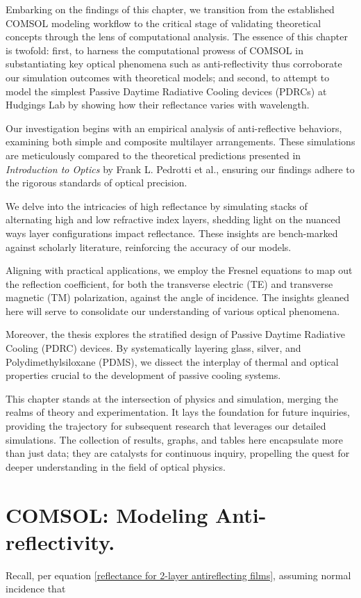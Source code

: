 Embarking on the findings of this chapter, we transition from the established COMSOL modeling workflow to the critical stage of validating theoretical concepts through the lens of computational analysis. The essence of this chapter is twofold: first, to harness the computational prowess of COMSOL in substantiating key optical phenomena such as anti-reflectivity thus corroborate our simulation outcomes with theoretical models; and second, to attempt to model the simplest Passive Daytime Radiative Cooling devices (PDRCs) at Hudgings Lab by showing how their reflectance varies with wavelength.

Our investigation begins with an empirical analysis of anti-reflective behaviors, examining both simple and composite multilayer arrangements. These simulations are meticulously compared to the theoretical predictions presented in \emph{Introduction to Optics} by Frank L. Pedrotti et al., ensuring our findings adhere to the rigorous standards of optical precision.

We delve into the intricacies of high reflectance by simulating stacks of alternating high and low refractive index layers, shedding light on the nuanced ways layer configurations impact reflectance. These insights are bench-marked against scholarly literature, reinforcing the accuracy of our models.

Aligning with practical applications, we employ the Fresnel equations to map out the reflection coefficient, for both the transverse electric (TE) and transverse magnetic (TM) polarization, against the angle of incidence. The insights gleaned here will serve to consolidate our understanding of various optical phenomena.

Moreover, the thesis explores the stratified design of Passive Daytime Radiative Cooling (PDRC) devices. By systematically layering glass, silver, and Polydimethylsiloxane (PDMS), we dissect the interplay of thermal and optical properties crucial to the development of passive cooling systems.

This chapter stands at the intersection of physics and simulation, merging the realms of theory and experimentation. It lays the foundation for future inquiries, providing the trajectory for subsequent research that leverages our detailed simulations. The collection of results, graphs, and tables here encapsulate more than just data; they are catalysts for continuous inquiry, propelling the quest for deeper understanding in the field of optical physics.

\section{COMSOL: Modeling Anti-reflectivity.}
Recall, per equation \ref{reflectance for 2-layer antireflecting films}, assuming normal incidence that

